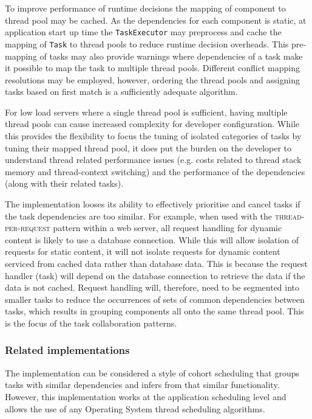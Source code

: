 \documentclass[prodmode]{style/acmlarge}
\begin{document}
To improve performance of runtime decisions the mapping of component to thread
pool may be cached.  As the dependencies for each component is static, at
application start up time the \texttt{TaskExecutor} may preprocess and
cache the mapping of \texttt{Task} to thread pools to reduce runtime
decision overheads.  This pre-mapping of tasks may also provide warnings
where dependencies of a task make it possible to map the task to
multiple thread pools.  Different conflict mapping resolutions may be employed,
however, ordering the thread pools and assigning tasks based on first match
is a sufficiently adequate algorithm.

For low load servers where a single thread pool is sufficient, having multiple
thread pools can cause increased complexity for developer configuration.  While
this provides the flexibility to focus the tuning of isolated categories of
tasks by tuning their mapped thread pool, it does put the burden on the
developer to understand thread related performance issues (e.g. costs related to
thread stack memory and thread-context switching) and the performance of the
dependencies (along with their related tasks).

The implementation looses its ability to effectively prioritise and cancel tasks
if the task dependencies are too similar.  For example, when used with the
\textsc{thread-per-request} pattern within a web server, all request handling
for dynamic content is likely to use a database connection.  While this will
allow isolation of requests for static content, it will not isolate requests for
dynamic content serviced from cached data rather than database data.  This is
because the request handler (task) will depend on the database connection to
retrieve the data if the data is not cached.  Request handling will, therefore,
need to be segmented into smaller tasks to reduce the occurrences of sets of
common dependencies between tasks, which results in grouping components all onto
the same thread pool.  This is the focus of the task collaboration patterns.


\subsubsection*{Related implementations}

The implementation can be considered a style of cohort scheduling \cite{cohort}
that groups tasks with similar dependencies and infers from that similar
functionality.  However, this implementation works at the application scheduling
level and allows the use of any Operating System thread scheduling algorithms.
\end{document}
